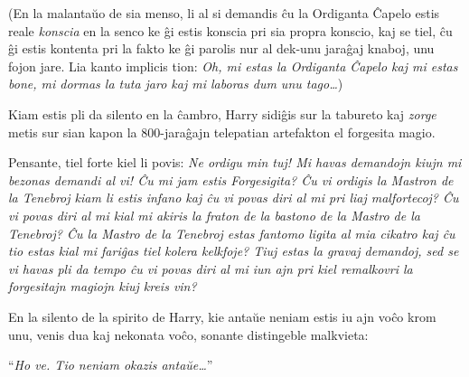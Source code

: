 (En la malantaŭo de sia menso, li al si demandis ĉu la Ordiganta
Ĉapelo estis reale \emph{konscia} en la senco ke ĝi estis konscia pri
sia propra konscio, kaj se tiel, ĉu ĝi estis kontenta pri la fakto ke
ĝi parolis nur al dek-unu jaraĝaj knaboj, unu fojon jare. Lia kanto
implicis tion: \emph{Oh, mi estas la Ordiganta Ĉapelo kaj mi estas
  bone, mi dormas la tuta jaro kaj mi laboras dum unu tago\ldots})

Kiam estis pli da silento en la ĉambro, Harry sidiĝis sur la tabureto
kaj \emph{zorge} metis sur sian kapon la 800-jaraĝajn telepatian
artefakton el forgesita magio.

Pensante, tiel forte kiel li povis: \emph{Ne ordigu min tuj! Mi havas
  demandojn kiujn mi bezonas demandi al vi! Ĉu mi jam estis
  Forgesigita?  Ĉu vi ordigis la Mastron de la Tenebroj kiam li estis
  infano kaj ĉu vi povas diri al mi pri liaj malfortecoj? Ĉu vi povas
  diri al mi kial mi akiris la fraton de la bastono de la Mastro de la
  Tenebroj?  Ĉu la Mastro de la Tenebroj estas fantomo ligita al mia
  cikatro kaj ĉu tio estas kial mi fariĝas tiel kolera kelkfoje? Tiuj
  estas la gravaj demandoj, sed se vi havas pli da tempo ĉu vi povas
  diri al mi iun ajn pri kiel remalkovri la forgesitajn magiojn kiuj
  kreis vin?}

En la silento de la spirito de Harry, kie antaŭe neniam estis iu ajn
voĉo krom unu, venis dua kaj nekonata voĉo, sonante distingeble
malkvieta:

``\emph{Ho ve. Tio neniam okazis antaŭe\ldots}''




